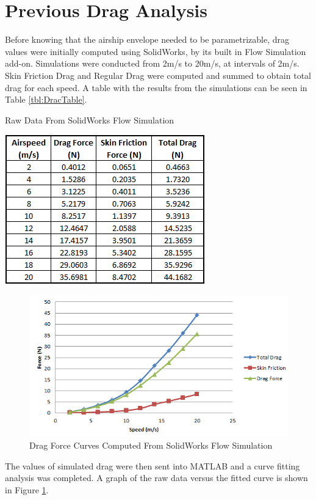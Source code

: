 \documentclass[../main.tex]{subfiles}
\begin{document}
\section{Previous Drag Analysis}

Before knowing that the airship envelope needed to be parametrizable, drag values were initially computed using SolidWorks, by its built in Flow Simulation add-on. Simulations were conducted from 2m/s to 20m/s, at intervals of 2m/s. Skin Friction Drag and Regular Drag were computed and summed to obtain total drag for each speed. A table with the results from the simulations can be seen in Table \ref{tbl:DracTable}.

\begin{table}[H]
	\centering
	\caption{Raw Data From SolidWorks Flow Simulation}
	\includegraphics[width=.5\linewidth]{img/drag/dragTable.PNG}
	\label{tbl:DracTable}
\end{table}

\begin{figure}[H]
	\centering
	\includegraphics[width=\linewidth]{img/drag/dragForces.PNG}
	\caption{Drag Force Curves Computed From SolidWorks Flow Simulation}
	\label{fig:dragForces}
\end{figure}

The values of simulated drag were then sent into MATLAB and a curve fitting analysis was completed. A graph of the raw data versus the fitted curve is shown in Figure \ref{fig:dragForces}.
\end{document}
